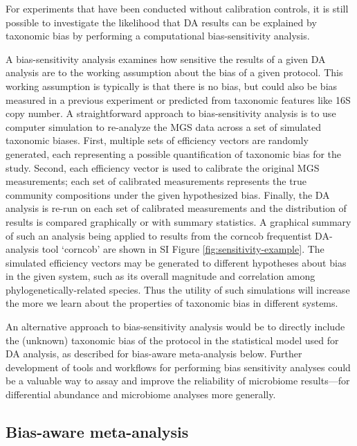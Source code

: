 \documentclass[
]{article}
\begin{document}
For experiments that have been conducted without calibration controls, it is still possible to investigate the likelihood that DA results can be explained by taxonomic bias by performing a computational bias-sensitivity analysis.

A bias-sensitivity analysis examines how sensitive the results of a given DA analysis are to the working assumption about the bias of a given protocol.
This working assumption is typically is that there is no bias, but could also be bias measured in a previous experiment or predicted from taxonomic features like 16S copy number.
A straightforward approach to bias-sensitivity analysis is to use computer simulation to re-analyze the MGS data across a set of simulated taxonomic biases.
First, multiple sets of efficiency vectors are randomly generated, each representing a possible quantification of taxonomic bias for the study.
Second, each efficiency vector is used to calibrate the original MGS measurements; each set of calibrated measurements represents the true community compositions under the given hypothesized bias.
Finally, the DA analysis is re-run on each set of calibrated measurements and the distribution of results is compared graphically or with summary statistics.
A graphical summary of such an analysis being applied to results from the corncob frequentist DA- analysis tool `corncob' are shown in SI Figure \ref{fig:sensitivity-example}.
The simulated efficiency vectors may be generated to different hypotheses about bias in the given system, such as its overall magnitude and correlation among phylogenetically-related species.
Thus the utility of such simulations will increase the more we learn about the properties of taxonomic bias in different systems.

An alternative approach to bias-sensitivity analysis would be to directly include the (unknown) taxonomic bias of the protocol in the statistical model used for DA analysis, as described for bias-aware meta-analysis below.
Further development of tools and workflows for performing bias sensitivity analyses could be a valuable way to assay and improve the reliability of microbiome results---for differential abundance and microbiome analyses more generally.

\hypertarget{bias-aware-meta-analysis}{%
\subsection{Bias-aware meta-analysis}\label{bias-aware-meta-analysis}}
\end{document}
